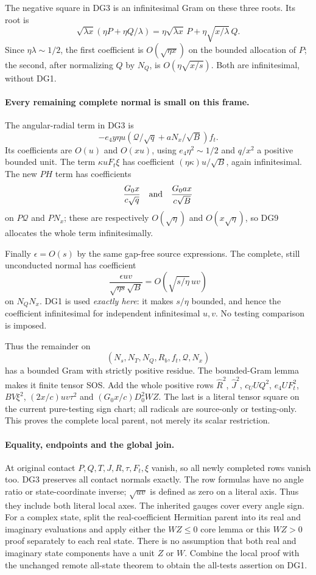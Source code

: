 The negative square in DG3 is an infinitesimal Gram on these three
roots. Its root is
\[
 \sqrt{\lambda x}(\eta P+\eta Q/\lambda)
   =\eta\sqrt{\lambda x}\,P+\eta\sqrt{x/\lambda}\,Q.
\]
Since $\eta\lambda\sim1/2$, the first coefficient is
$O(\sqrt{\eta x})$ on the bounded allocation of $P$; the second,
after normalizing $Q$ by $N_Q$, is
$O(\eta\sqrt{x/s})$. Both are infinitesimal, without DG1.

\paragraph{Every remaining complete normal is small on this frame.}
The angular-radial term in DG3 is
\[
 -e_4y\eta u\left(\mathcal Q/\sqrt q
                             +aN_x/\sqrt B\right)f_t.
\]
Its coefficients are $O(u)$ and $O(xu)$, using
$e_4\eta^2\sim1/2$ and $q/x^2$ a positive bounded unit.
The term $\kappa uF_t\xi$ has coefficient
$(\eta\kappa)u/\sqrt B$, again infinitesimal.
The new $PH$ term has coefficients
\[
 \frac{G_0x}{c\sqrt q}\quad\hbox{and}\quad
 \frac{G_0ax}{c\sqrt B}
\]
on $P\mathcal Q$ and $PN_x$; these are respectively
$O(\sqrt\eta)$ and $O(x\sqrt\eta)$, so DG9 allocates the whole
term infinitesimally.

Finally $\epsilon=O(s)$ by the same gap-free source expressions.
The complete, still unconducted normal has coefficient
\[
 \frac{\epsilon uv}{\sqrt{\eta s}\sqrt B}
         =O\!\left(\sqrt{s/\eta}\,uv\right)          \tag{DG10}
\]
on $N_QN_x$. DG1 is used \emph{exactly here}: it makes $s/\eta$
bounded, and hence the coefficient infinitesimal for independent
infinitesimal $u,v$. No testing comparison is imposed.

Thus the remainder on
\[
                  (N_s,N_T,N_Q,R_b,f_t,\mathcal Q,N_x)
\]
has a bounded Gram with strictly positive residue. The bounded-Gram
lemma makes it finite tensor SOS. Add the whole positive rows
$\widehat R^2$, $\widehat J^2$, $c_UUQ^2$, $e_4UF_t^2$,
$BV\xi^2$, $(2x/c)uv\tau^2$ and
$(G_0x/c)D_0^2WZ$. The last is a literal tensor square on the current
pure-testing sign chart; all radicals are source-only or testing-only.
This proves the complete local parent, not merely its scalar
restriction.

\paragraph{Equality, endpoints and the global join.}
At original contact $P,Q,T,J,R,\tau,F_t,\xi$ vanish, so all newly
completed rows vanish too. DG3 preserves all contact normals exactly.
The row formulas have no angle ratio or state-coordinate inverse;
$\sqrt{uv}$ is defined as zero on a literal axis. Thus they include
both literal local axes. The inherited gauges cover every angle sign.
For a complex state, split the real-coefficient Hermitian parent into
its real and imaginary evaluations and apply either the $WZ\le0$
core lemma or this $WZ>0$ proof separately to each real state. There
is no assumption that both real and imaginary state components have
a unit $Z$ or $W$. Combine the local proof with the unchanged remote
all-state theorem to obtain the all-tests assertion on DG1.


